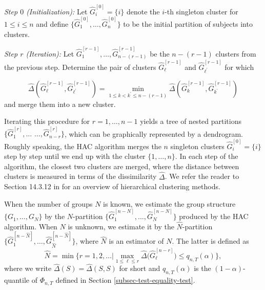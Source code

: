 \noindent \textit{Step $0$ (Initialization):} Let $\widehat{G}_i^{[0]} = \{ i \}$ denote the $i$-th singleton cluster for $1 \le i \le n$ and define $\{\widehat{G}_1^{[0]},\ldots,\widehat{G}_n^{[0]} \}$ to be the initial partition of subjects into clusters. 
\vspace{5pt}

\noindent \textit{Step $r$ (Iteration):} Let $\widehat{G}_1^{[r-1]},\ldots,\widehat{G}_{n-(r-1)}^{[r-1]}$ be the $n-(r-1)$ clusters from the previous step. Determine the pair of clusters $\widehat{G}_{\ell}^{[r-1]}$ and $\widehat{G}_{{\ell}^\prime}^{[r-1]}$ for which 

\[ \widehat{\Delta}(\widehat{G}_{\ell}^{[r-1]},\widehat{G}_{{\ell}^\prime}^{[r-1]}) = \min_{1 \le k < k^\prime \le n-(r-1)} \widehat{\Delta}(\widehat{G}_{k}^{[r-1]},\widehat{G}_{k^\prime}^{[r-1]}) \]  
and merge them into a new cluster. 
\vspace{10pt}

\noindent Iterating this procedure for $r = 1,\ldots,n-1$ yields a tree of nested partitions $\{\widehat{G}_1^{[r]},\ldots$ $\ldots,\widehat{G}_{n-r}^{[r]}\}$, which can be graphically represented by a dendrogram. Roughly speaking, the HAC algorithm merges the $n$ singleton clusters $\widehat{G}_i^{[0]} = \{ i \}$ step by step until we end up with the cluster $\{1,\ldots,n\}$. In each step of the algorithm, the closest two clusters are merged, where the distance between clusters is measured in terms of the dissimilarity $\widehat{\Delta}$. We refer the reader to Section 14.3.12 in \cite{HastieTibshiraniFriedman2009} for an overview of hierarchical clustering methods. 


When the number of groups $N$ is known, we estimate the group structure $\{G_1,\ldots, G_N\}$ by the $N$-partition $\{\widehat{G}_1^{[n-N]},\ldots,\widehat{G}_{N}^{[n-N]}\}$ produced by the HAC algorithm. When $N$ is unknown, we estimate it by the $\widehat{N}$-partition $\{\widehat{G}_1^{[n-\widehat{N}]},\ldots,\widehat{G}_{\widehat{N}}^{[n-\widehat{N}]}\}$, where $\widehat{N}$ is an estimator of $N$. The latter is defined as 
\[ \widehat{N} = \min \Big\{ r = 1,2,\ldots \Big| \max_{1 \le \ell \le r} \widehat{\Delta} \big( \widehat{G}_\ell^{[n-r]} \big) \le q_{n,T}(\alpha) \Big\}, \]
where we write $\widehat{\Delta}(S) = \widehat{\Delta}(S,S)$ for short and $q_{n,T}(\alpha)$ is the $(1-\alpha)$-quantile of $\Phi_{n,T}$ defined in Section \ref{subsec-test-equality-test}. 


